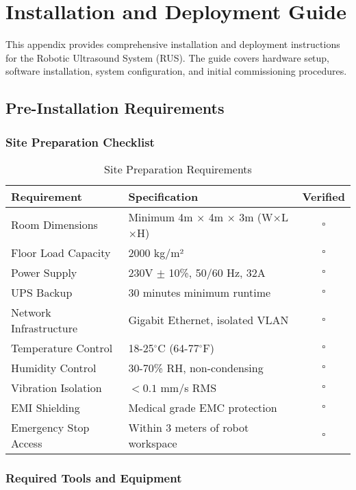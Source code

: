 \section{Installation and Deployment Guide}
\label{app:installation-guide}

This appendix provides comprehensive installation and deployment instructions for the Robotic Ultrasound System (RUS). The guide covers hardware setup, software installation, system configuration, and initial commissioning procedures.

\subsection{Pre-Installation Requirements}

\subsubsection{Site Preparation Checklist}

\begin{table}[htbp]
\centering
\caption{Site Preparation Requirements}
\label{tab:app-site-requirements}
\begin{tabular}{|l|l|c|}
\hline
\textbf{Requirement} & \textbf{Specification} & \textbf{Verified} \\
\hline
Room Dimensions & Minimum 4m $\times$ 4m $\times$ 3m (W$\times$L$\times$H) & $\square$ \\
Floor Load Capacity & 2000 kg/m² & $\square$ \\
Power Supply & 230V $\pm$ 10\%, 50/60 Hz, 32A & $\square$ \\
UPS Backup & 30 minutes minimum runtime & $\square$ \\
Network Infrastructure & Gigabit Ethernet, isolated VLAN & $\square$ \\
Temperature Control & 18-25$^\circ$C (64-77$^\circ$F) & $\square$ \\
Humidity Control & 30-70\% RH, non-condensing & $\square$ \\
Vibration Isolation & $< 0.1$ mm/s RMS & $\square$ \\
EMI Shielding & Medical grade EMC protection & $\square$ \\
Emergency Stop Access & Within 3 meters of robot workspace & $\square$ \\
\hline
\end{tabular}
\end{table}

\subsubsection{Required Tools and Equipment}

